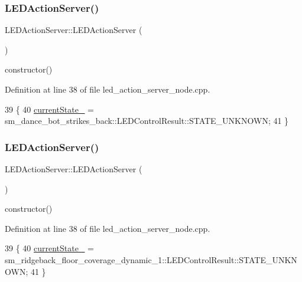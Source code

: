 \subsubsection{\texorpdfstring{L\+E\+D\+Action\+Server()}{LEDActionServer()}\hspace{0.1cm}{\footnotesize\ttfamily [2/4]}}
{\footnotesize\ttfamily L\+E\+D\+Action\+Server\+::\+L\+E\+D\+Action\+Server (\begin{DoxyParamCaption}{ }\end{DoxyParamCaption})\hspace{0.3cm}{\ttfamily [inline]}}

constructor() 

Definition at line 38 of file led\+\_\+action\+\_\+server\+\_\+node.\+cpp.


\begin{DoxyCode}
39   \{
40     \hyperlink{classLEDActionServer_a1dc456e987dc331501ad6ff2215661ff}{currentState\_} =  sm\_dance\_bot\_strikes\_back::LEDControlResult::STATE\_UNKNOWN;
41   \}
\end{DoxyCode}
\mbox{\label{classLEDActionServer_a6978c43940438b9fd8bfcd6b443092d3}} 
\subsubsection{\texorpdfstring{L\+E\+D\+Action\+Server()}{LEDActionServer()}\hspace{0.1cm}{\footnotesize\ttfamily [3/4]}}
{\footnotesize\ttfamily L\+E\+D\+Action\+Server\+::\+L\+E\+D\+Action\+Server (\begin{DoxyParamCaption}{ }\end{DoxyParamCaption})\hspace{0.3cm}{\ttfamily [inline]}}

constructor() 

Definition at line 38 of file led\+\_\+action\+\_\+server\+\_\+node.\+cpp.


\begin{DoxyCode}
39   \{
40     \hyperlink{classLEDActionServer_a1dc456e987dc331501ad6ff2215661ff}{currentState\_} =  sm\_ridgeback\_floor\_coverage\_dynamic\_1::LEDControlResult::STATE\_UNKNOWN;
41   \}
\end{DoxyCode}
\mbox{\label{classLEDActionServer_a6978c43940438b9fd8bfcd6b443092d3}} 
